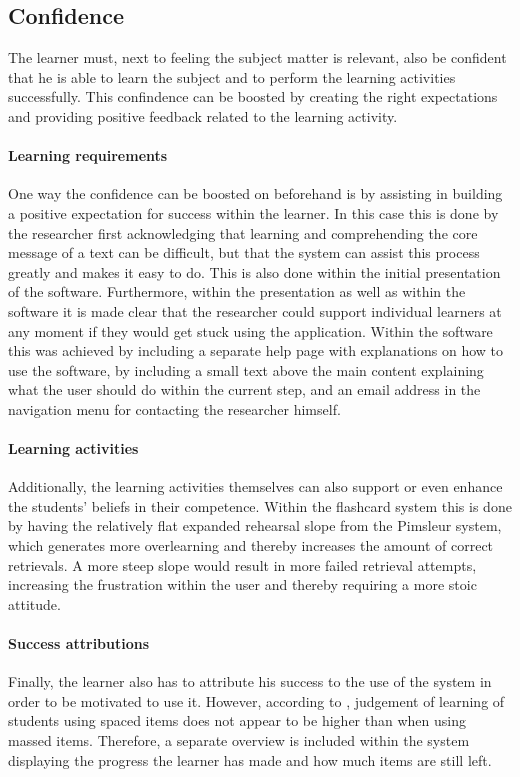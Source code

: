         \subsection{Confidence}

The learner must, next to feeling the subject matter is relevant, also be confident that he is able to learn the subject and to perform the learning activities successfully. This confindence can be boosted by creating the right expectations and providing positive feedback related to the learning activity.
        
\paragraph{Learning requirements} One way the confidence can be boosted on beforehand is by assisting in building a positive expectation for success within the learner. In this case this is done by the researcher first acknowledging that learning and comprehending the core message of a text can be difficult, but that the system can assist this process greatly and makes it easy to do. This is also done within the initial presentation of the software. Furthermore, within the presentation as well as within the software it is made clear that the researcher could support individual learners at any moment if they would get stuck using the application. Within the software this was achieved by including a separate help page with explanations on how to use the software, by including a small text above the main content explaining what the user should do within the current step, and an email address in the navigation menu for contacting the researcher himself.

\paragraph{Learning activities} Additionally, the learning activities themselves can also support or even enhance the students' beliefs in their competence. Within the flashcard system this is done by having the relatively flat expanded rehearsal slope from the Pimsleur system, which generates more overlearning and thereby increases the amount of correct retrievals. A more steep slope would result in more failed retrieval attempts, increasing the frustration within the user and thereby requiring a more stoic attitude.

\paragraph{Success attributions} Finally, the learner also has to attribute his success to the use of the system in order to be motivated to use it. However, according to , judgement of learning of students using spaced items does not appear to be higher than when using massed items. Therefore, a separate overview is included within the system displaying the progress the learner has made and how much items are still left.

